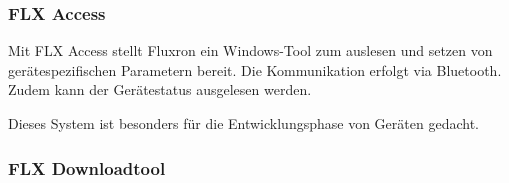 \subsubsection{FLX Access}
\label{subsubsec:FLX Access}
Mit FLX Access stellt Fluxron ein Windows-Tool zum auslesen und setzen von gerätespezifischen Parametern bereit. Die Kommunikation erfolgt via Bluetooth. Zudem kann der Gerätestatus ausgelesen werden. 

Dieses System ist besonders für die Entwicklungsphase von Geräten gedacht.
\subsubsection{FLX Downloadtool}
\label{subsubsec:FLX Downloadtool}

